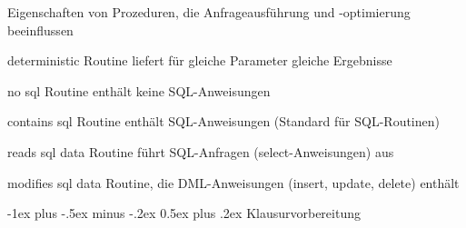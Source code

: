 \documentclass[a4paper]{article}
\makeatletter
\renewcommand{\section}{\@startsection{section}{1}{0mm}%
                                {-1ex plus -.5ex minus -.2ex}%
                                {0.5ex plus .2ex}%
                                {\normalfont\large\bfseries}}
\makeatother
\begin{document}
\begin{multicols}{3}
    Eigenschaften von Prozeduren, die Anfrageausführung und -optimierung beeinflussen
    \begin{description*}
        \item[deterministic] Routine liefert für gleiche Parameter gleiche Ergebnisse
        \item[no sql] Routine enthält keine SQL-Anweisungen
        \item[contains sql] Routine enthält SQL-Anweisungen (Standard für SQL-Routinen)
        \item[reads sql data] Routine führt SQL-Anfragen (select-Anweisungen) aus
        \item[modifies sql data] Routine, die DML-Anweisungen (insert, update, delete) enthält
    \end{description*}

\end{multicols}

\newpage

\begin{centering}
    \section{Klausurvorbereitung}
\end{centering}
\end{document}
